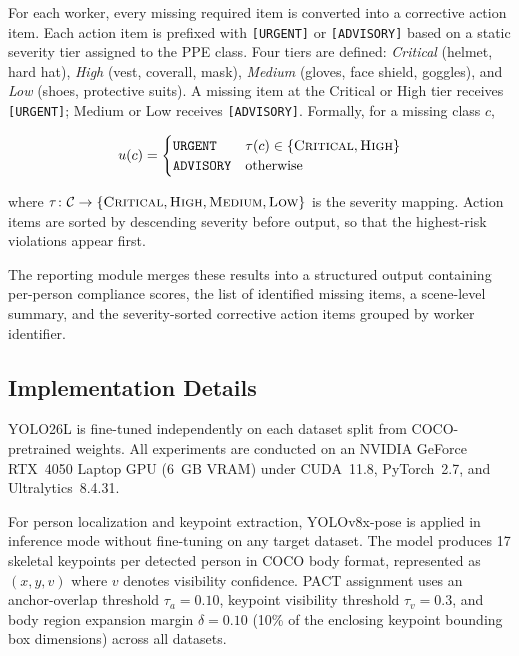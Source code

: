 \documentclass[conference]{IEEEtran}
\begin{document}
For each worker, every missing required item is converted into a corrective action item.  Each action item is prefixed with \texttt{[URGENT]} or \texttt{[ADVISORY]} based on a static severity tier assigned to the PPE class.  Four tiers are defined: \textit{Critical} (helmet, hard hat), \textit{High} (vest, coverall, mask), \textit{Medium} (gloves, face shield, goggles), and \textit{Low} (shoes, protective suits).  A missing item at the Critical or High tier receives \texttt{[URGENT]}; Medium or Low receives \texttt{[ADVISORY]}.  Formally, for a missing class $c$,

\begin{equation}
u(c) =
\begin{cases}
\texttt{URGENT}   & \tau(c) \in \{\textsc{Critical}, \textsc{High}\} \\
\texttt{ADVISORY} & \text{otherwise}
\end{cases}
\end{equation}

where $\tau\colon \mathcal{C} \to \{\textsc{Critical}, \textsc{High}, \textsc{Medium}, \textsc{Low}\}$ is the severity mapping.  Action items are sorted by descending severity before output, so that the highest-risk violations appear first.

The reporting module merges these results into a structured output containing per-person compliance scores, the list of identified missing items, a scene-level summary, and the severity-sorted corrective action items grouped by worker identifier.


\subsection{Implementation Details}
YOLO26L is fine-tuned independently on each dataset split from COCO-pretrained weights. All experiments are conducted on an NVIDIA GeForce RTX~4050 Laptop GPU (6~GB VRAM) under CUDA~11.8, PyTorch~2.7, and Ultralytics~8.4.31.

For person localization and keypoint extraction, YOLOv8x-pose is applied in inference mode without fine-tuning on any target dataset. The model produces 17 skeletal keypoints per detected person in COCO body format, represented as $(x, y, v)$ where $v$ denotes visibility confidence. PACT assignment uses an anchor-overlap threshold $\tau_a = 0.10$, keypoint visibility threshold $\tau_v = 0.3$, and body region expansion margin $\delta = 0.10$ (10\% of the enclosing keypoint bounding box dimensions) across all datasets.
\end{document}

